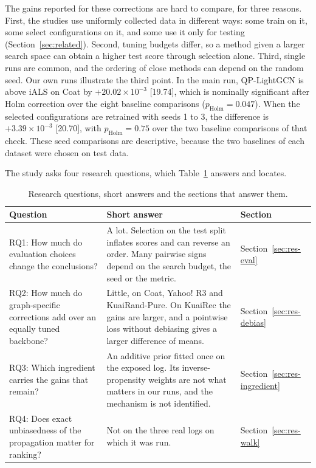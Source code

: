 The gains reported for these corrections are hard to compare, for three reasons. First, the studies use uniformly
collected data in different ways: some train on it, some select configurations on it, and some use it only for testing
(Section~\ref{sec:related}). Second, tuning budgets differ, so a method given a larger search space can obtain a higher
test score through selection alone. Third, single runs are common, and the ordering of close methods can depend on the
random seed. Our own runs illustrate the third point. In the main run, QP-LightGCN is above iALS on Coat by
$+20.02\times10^{-3}$ [19.74], which is nominally significant after Holm correction over the eight baseline comparisons
($p_\mathrm{Holm}=0.047$). When the selected configurations are retrained with seeds 1 to 3, the difference is
$+3.39\times10^{-3}$ [20.70], with $p_\mathrm{Holm}=0.75$ over the two baseline comparisons of that check. These seed
comparisons are descriptive, because the two baselines of each dataset were chosen on test data.

The study asks four research questions, which Table~\ref{tab:rq} answers and locates.

\begin{table}[htbp]\centering\footnotesize
\caption{Research questions, short answers and the sections that answer them.}\label{tab:rq}
\begin{tabular}{p{4.6cm}p{7.2cm}l}
\toprule
Question & Short answer & Section \\
\midrule
RQ1: How much do evaluation choices change the conclusions? & A lot. Selection on the test split inflates scores and can reverse an order. Many pairwise signs depend on the search budget, the seed or the metric. & Section~\ref{sec:res-eval} \\
RQ2: How much do graph-specific corrections add over an equally tuned backbone? & Little, on Coat, Yahoo! R3 and KuaiRand-Pure. On KuaiRec the gains are larger, and a pointwise loss without debiasing gives a larger difference of means. & Section~\ref{sec:res-debias} \\
RQ3: Which ingredient carries the gains that remain? & An additive prior fitted once on the exposed log. Its inverse-propensity weights are not what matters in our runs, and the mechanism is not identified. & Section~\ref{sec:res-ingredient} \\
RQ4: Does exact unbiasedness of the propagation matter for ranking? & Not on the three real logs on which it was run. & Section~\ref{sec:res-walk} \\
\bottomrule
\end{tabular}
\end{table}


